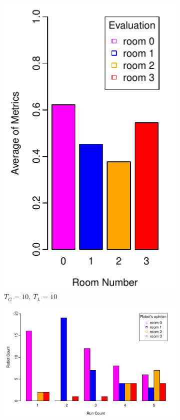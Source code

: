 \documentclass{llncs}
\begin{document}
\begin{figure}[h!]
        \begin{subfigure}[b]{0.25\textwidth}
                \includegraphics[width=\textwidth]{PLOT/EVAL/eval2}
                \caption{$T_G = 10$, $T_L = 10$}
                \label{fig:eval1}
        \end{subfigure}%
        \qquad
        \begin{subfigure}[b]{0.67\textwidth}
                \includegraphics[width=\textwidth]{PLOT/EXP/exp2}

\end{subfigure}
\end{figure}
\end{document}
